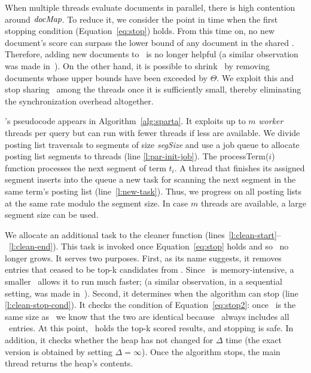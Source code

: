 
When multiple threads evaluate documents in parallel, there is high contention around  $\textit{docMap}$.
To reduce it, we 
consider the point in time when the first stopping condition (Equation~\ref{eq:stop}) holds. From this time on, no new document's score can surpass the lower bound of any document in the shared \DHeap. Therefore, adding new documents to \DMap\ is no longer helpful (a similar observation was made  in~\cite{Mamoulis:2007}). 
On the other hand, it is possible to shrink \DMap\ by removing documents whose upper bounds have been exceeded by $\Theta$.
We exploit this and stop sharing \DMap\ among the threads once it is sufficiently small, thereby eliminating the synchronization overhead altogether.





\alg's pseudocode appears in Algorithm~\ref{alg:sparta}. It exploits up to $m$ {\em worker\/} threads per query but can run with fewer threads if less are available. 
We divide posting list traversals to segments of size \emph{segSize} and use a job queue to allocate posting list segments to threads (line \ref{l:par-init-job}). 
The  {\sc processTerm($i$)} function processes the next segment of term $t_i$. 
A  thread that finishes its assigned segment inserts into the queue a new task for scanning the next segment in the same term's posting list 
(line~\ref{l:new-task}). Thus, we progress on all posting lists at the same rate modulo the segment size. 
In case $m$ threads are available, a large segment size can be used.

We allocate an additional task to  the 
{\sc cleaner} function (lines~\ref{l:clean-start}--~\ref{l:clean-end}).
This task is invoked once Equation~\ref{eq:stop} holds and so  \DMap\ no longer grows.
It serves two purposes. First, as its name suggests, it removes entries that ceased to be top-k candidates from \DMap. %
Since \alg\ is memory-intensive, a smaller \DMap\  allows it to run much faster; 
(a similar observation, in a sequential setting, was made in~\cite{Gursky:2008}). 
Second, it determines when the algorithm can stop (line \ref{l:clean-stop-cond}).  
It  checks the  condition of Equation~\ref{eq:stop2}: 
once \DMap\ is the same size as \DHeap\ we know that the two are identical because \DMap\ always includes all \DHeap\ entries. 
At this point, \DHeap\ holds the top-k scored results, and stopping is safe. 
In addition, it checks whether the heap has not changed for $\Delta$ time 
(the exact version is obtained by setting $\Delta=\infty$). 
%
Once the algorithm stops, the main thread returns the heap's contents. 

